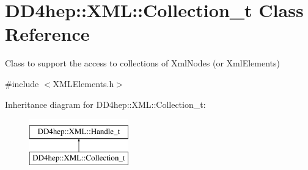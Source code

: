 \hypertarget{class_d_d4hep_1_1_x_m_l_1_1_collection__t}{}\section{D\+D4hep\+:\+:X\+ML\+:\+:Collection\+\_\+t Class Reference}
\label{class_d_d4hep_1_1_x_m_l_1_1_collection__t}


Class to support the access to collections of Xml\+Nodes (or Xml\+Elements)  




{\ttfamily \#include $<$X\+M\+L\+Elements.\+h$>$}

Inheritance diagram for D\+D4hep\+:\+:X\+ML\+:\+:Collection\+\_\+t\+:\begin{figure}[H]
\begin{center}
\leavevmode
\includegraphics[height=2.000000cm]{class_d_d4hep_1_1_x_m_l_1_1_collection__t}
\end{center}
\end{figure}
